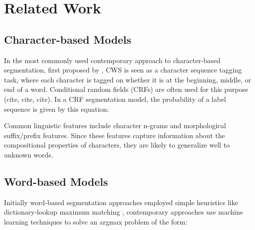 \section{Related Work}

\subsection{Character-based Models}
In the most commonly used contemporary approach to character-based segmentation, first proposed by \cite{Xue:2003:IJCLCLP}, CWS is seen as a character sequence tagging task, where each character is tagged on whether it is at the beginning, middle, or end of a word. Conditional random fields (CRFs) are often used for this purpose (cite, cite, cite). In a CRF segmentation model, the probability of a label sequence is given by this equation:


Common linguistic features include character n-grams and morphological suffix/prefix features. Since these features capture information about the compositional properties of characters, they are likely to generalize well to unknown words.


\subsection{Word-based Models}

Initially word-based segmentation approaches employed simple heuristics like dictionary-lookup maximum matching \cite{Chen:1992:ACL}, contemporary approaches use machine learning techniques to solve an argmax problem of the form:




%
% 

